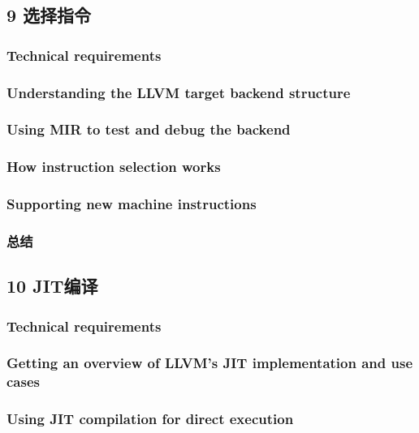 \documentclass[11pt,a4paper,UTF8]{ctexart}
\begin{document}
	\subsection{9 选择指令}
		\subsubsection{Technical requirements}
		\subsubsection{Understanding the LLVM target backend structure}
		\subsubsection{Using MIR to test and debug the backend}
		\subsubsection{How instruction selection works}		
		\subsubsection{Supporting new machine instructions}
		\subsubsection{总结}
	\subsection{10 JIT编译}
		\subsubsection{Technical requirements}
		\subsubsection{Getting an overview of LLVM's JIT implementation and use cases}
		\subsubsection{Using JIT compilation for direct execution}
\end{document}
